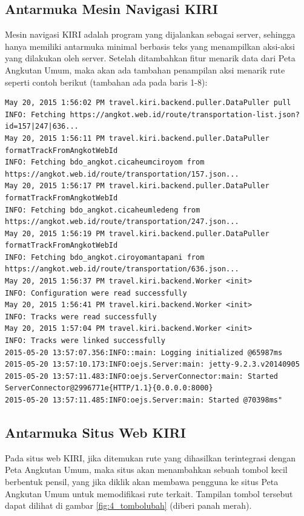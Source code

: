 \subsection{Antarmuka Mesin Navigasi KIRI}

Mesin navigasi KIRI adalah program yang dijalankan sebagai server, sehingga hanya memiliki antarmuka minimal berbasis teks yang menampilkan aksi-aksi yang dilakukan oleh server. Setelah ditambahkan fitur menarik data dari Peta Angkutan Umum, maka akan ada tambahan penampilan aksi menarik rute seperti contoh berikut (tambahan ada pada baris 1-8):

\begin{lstlisting}
May 20, 2015 1:56:02 PM travel.kiri.backend.puller.DataPuller pull
INFO: Fetching https://angkot.web.id/route/transportation-list.json?id=157|247|636...
May 20, 2015 1:56:11 PM travel.kiri.backend.puller.DataPuller formatTrackFromAngkotWebId
INFO: Fetching bdo_angkot.cicaheumciroyom from https://angkot.web.id/route/transportation/157.json...
May 20, 2015 1:56:17 PM travel.kiri.backend.puller.DataPuller formatTrackFromAngkotWebId
INFO: Fetching bdo_angkot.cicaheumledeng from https://angkot.web.id/route/transportation/247.json...
May 20, 2015 1:56:19 PM travel.kiri.backend.puller.DataPuller formatTrackFromAngkotWebId
INFO: Fetching bdo_angkot.ciroyomantapani from https://angkot.web.id/route/transportation/636.json...
May 20, 2015 1:56:37 PM travel.kiri.backend.Worker <init>
INFO: Configuration were read successfully
May 20, 2015 1:56:41 PM travel.kiri.backend.Worker <init>
INFO: Tracks were read successfully
May 20, 2015 1:57:04 PM travel.kiri.backend.Worker <init>
INFO: Tracks were linked successfully
2015-05-20 13:57:07.356:INFO::main: Logging initialized @65987ms
2015-05-20 13:57:10.173:INFO:oejs.Server:main: jetty-9.2.3.v20140905
2015-05-20 13:57:11.483:INFO:oejs.ServerConnector:main: Started ServerConnector@2996771e{HTTP/1.1}{0.0.0.0:8000}
2015-05-20 13:57:11.485:INFO:oejs.Server:main: Started @70398ms"
\end{lstlisting}


\subsection{Antarmuka Situs Web KIRI}

Pada situs web KIRI, jika ditemukan rute yang dihasilkan terintegrasi dengan Peta Angkutan Umum, maka situs akan menambahkan sebuah tombol kecil berbentuk pensil, yang jika diklik akan membawa pengguna ke situs Peta Angkutan Umum untuk memodifikasi rute terkait. Tampilan tombol tersebut dapat dilihat di gambar \ref{fig:4_tombolubah} (diberi panah merah).

